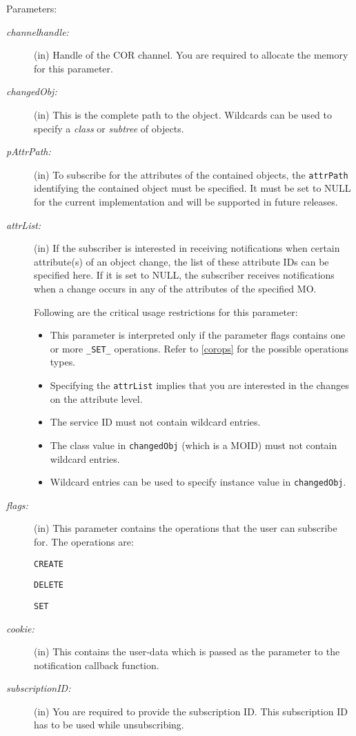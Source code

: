 \begin{flushleft}
\begin{Desc}
\item[Parameters:]
\begin{description}

\item[{\em channel\-handle:}](in) Handle of the COR channel. You are required to allocate the memory for this parameter.

\item[{\em changed\-Obj:}](in) This is the complete path to the object. Wildcards 
can be used to specify a \textit{class} or \textit{subtree} of objects.

\item[{\em p\-Attr\-Path:}](in) To subscribe for the attributes of the contained objects, the {\tt{attrPath}} identifying the contained object must be
specified. It must be set to NULL for the current implementation and will be supported in future releases.

\item[{\em attr\-List:}](in) If the subscriber is interested in receiving notifications when certain attribute(s) of an object change, the list of these 
attribute IDs can be specified here. If it is set to NULL, the subscriber receives notifications when a change occurs in any of the attributes of the
specified MO. 
\par
 Following are the critical usage restrictions for this parameter:
\begin{itemize}
\item
This parameter is interpreted only if the parameter flags contains one or more {\tt{\_\-SET\_\-}} operations. Refer
 to \ref{corops} for the possible operations types.
\item

 Specifying the {\tt{attrList}} implies that you are interested in the changes on the attribute level. 
 \item

 The service ID must not contain wildcard entries.
 \item

 The class value in {\tt{changedObj}} (which is a MOID) must not contain wildcard entries.
 \item

 Wildcard entries can be used to specify instance value in {\tt{changedObj}}.
 \end{itemize}

\item[{\em flags:}](in) This parameter contains the operations that the user can subscribe for. The operations are:
 \par
 {\tt{CREATE}} 
  \par
 {\tt{DELETE}}
  \par
 {\tt{SET}}
\item[{\em cookie:}](in) This contains the user-data which is passed as the parameter to the notification callback function.  
\item[{\em subscription\-ID:}](in) You are required to provide the subscription ID. This subscription ID has to 
be used while unsubscribing.


\end{description}
\end{Desc}
\end{flushleft}
